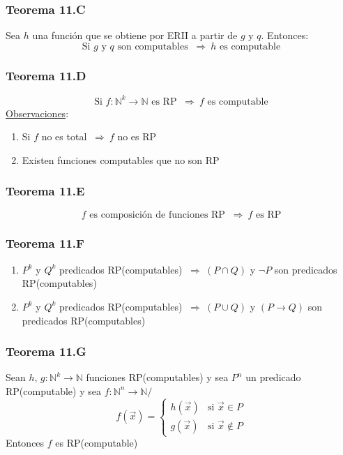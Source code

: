 \documentclass{article}
\newcommand{\comma}{,\,}                                %
\newcommand{\tq}{/\,}                                   %
\newcommand{\naturales}{\mathbb{N}}                     %
\newcommand{\Rightarrows}{\: \Rightarrow \:}            %
\begin{document}
\subsubsection{Teorema 11.C}
Sea $h$ una función que se obtiene por ERII a partir de $g$ y $q$. Entonces:
\begin{equation*}
    \text{Si $g$ y $q$ son computables $\Rightarrows h$ es computable}
\end{equation*}

\subsubsection{Teorema 11.D}
\begin{equation*}
    \text{Si $f: \naturales^k \rightarrow \naturales$ es RP $\Rightarrows f$ es computable}    
\end{equation*}
\underline{Observaciones}:
\begin{enumerate}
    \item Si $f$ no es total $\Rightarrows f$ no es RP
    \item Existen funciones computables que no son RP
\end{enumerate}

\subsubsection{Teorema 11.E}
\begin{equation*}
    f \text{ es composición de funciones RP } \Rightarrows f \text{ es RP}
\end{equation*}

\subsubsection{Teorema 11.F}
\begin{enumerate}
    \item $P^k$ y $Q^k$ predicados RP(computables) $\Rightarrows (P \cap Q)$ y $\neg P$ son predicados RP(computables)
    \item $P^k$ y $Q^k$ predicados RP(computables) $\Rightarrows (P \cup Q)$ y $(P \rightarrow Q)$ son predicados RP(computables)
\end{enumerate}

\subsubsection{Teorema 11.G}
Sean $h \comma g: \naturales^k \rightarrow \naturales$ funciones RP(computables) y sea $P^n$ un predicado RP(computable) y sea $f: \naturales^n \rightarrow \naturales \tq$
\begin{equation*}
    f(\Vec{x}) = \begin{cases}
    h(\Vec{x}) &\text{si } \Vec{x} \in P \\
    g(\Vec{x}) &\text{si } \Vec{x}  \notin P
    \end{cases}
\end{equation*}
Entonces $f$ es RP(computable)
\end{document}
